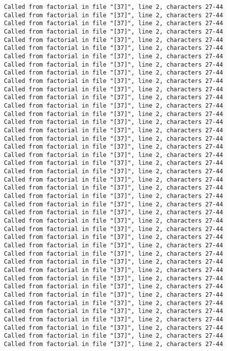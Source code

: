 \documentclass[11pt]{article}
\begin{document}
\begin{Verbatim}[commandchars=\\\{\}, frame=single, framerule=2mm, rulecolor=\color{outerrorbackground}]
Called from factorial in file "[37]", line 2, characters 27-44
Called from factorial in file "[37]", line 2, characters 27-44
Called from factorial in file "[37]", line 2, characters 27-44
Called from factorial in file "[37]", line 2, characters 27-44
Called from factorial in file "[37]", line 2, characters 27-44
Called from factorial in file "[37]", line 2, characters 27-44
Called from factorial in file "[37]", line 2, characters 27-44
Called from factorial in file "[37]", line 2, characters 27-44
Called from factorial in file "[37]", line 2, characters 27-44
Called from factorial in file "[37]", line 2, characters 27-44
Called from factorial in file "[37]", line 2, characters 27-44
Called from factorial in file "[37]", line 2, characters 27-44
Called from factorial in file "[37]", line 2, characters 27-44
Called from factorial in file "[37]", line 2, characters 27-44
Called from factorial in file "[37]", line 2, characters 27-44
Called from factorial in file "[37]", line 2, characters 27-44
Called from factorial in file "[37]", line 2, characters 27-44
Called from factorial in file "[37]", line 2, characters 27-44
Called from factorial in file "[37]", line 2, characters 27-44
Called from factorial in file "[37]", line 2, characters 27-44
Called from factorial in file "[37]", line 2, characters 27-44
Called from factorial in file "[37]", line 2, characters 27-44
Called from factorial in file "[37]", line 2, characters 27-44
Called from factorial in file "[37]", line 2, characters 27-44
Called from factorial in file "[37]", line 2, characters 27-44
Called from factorial in file "[37]", line 2, characters 27-44
Called from factorial in file "[37]", line 2, characters 27-44
Called from factorial in file "[37]", line 2, characters 27-44
Called from factorial in file "[37]", line 2, characters 27-44
Called from factorial in file "[37]", line 2, characters 27-44
Called from factorial in file "[37]", line 2, characters 27-44
Called from factorial in file "[37]", line 2, characters 27-44
Called from factorial in file "[37]", line 2, characters 27-44
Called from factorial in file "[37]", line 2, characters 27-44
Called from factorial in file "[37]", line 2, characters 27-44
Called from factorial in file "[37]", line 2, characters 27-44
Called from factorial in file "[37]", line 2, characters 27-44
Called from factorial in file "[37]", line 2, characters 27-44
Called from factorial in file "[37]", line 2, characters 27-44
Called from factorial in file "[37]", line 2, characters 27-44
Called from factorial in file "[37]", line 2, characters 27-44
Called from factorial in file "[37]", line 2, characters 27-44

\end{Verbatim}
\end{document}
